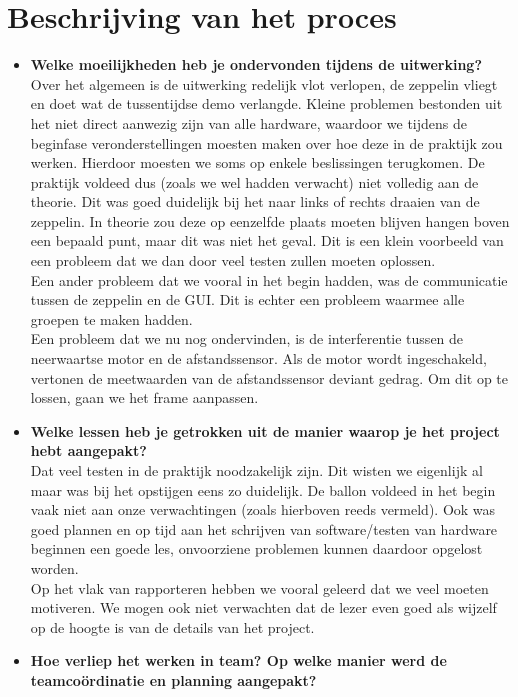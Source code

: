 \documentclass[eind]{penoverslag}
\begin{document}
\section{Beschrijving van het proces}
\begin{itemize}
\item \textbf{Welke moeilijkheden heb je ondervonden tijdens de uitwerking?} \\
Over het algemeen is de uitwerking redelijk vlot verlopen, de zeppelin vliegt en doet wat de tussentijdse demo verlangde.  Kleine problemen bestonden uit het niet direct aanwezig zijn van alle hardware, waardoor we tijdens de beginfase veronderstellingen moesten maken over hoe deze in de praktijk zou werken. Hierdoor moesten we soms op enkele beslissingen terugkomen. De praktijk voldeed dus (zoals we wel hadden verwacht) niet volledig aan de theorie. Dit was goed duidelijk bij het naar links of rechts draaien van de zeppelin. In theorie zou deze op eenzelfde plaats moeten blijven hangen boven een bepaald punt, maar dit was niet het geval. Dit is een klein voorbeeld van een probleem dat we dan door veel testen zullen moeten oplossen. \\
Een ander probleem dat we vooral in het begin hadden, was de communicatie tussen de zeppelin en de GUI. Dit is echter een probleem waarmee alle groepen te maken hadden.\\
Een probleem dat we nu nog ondervinden, is de interferentie tussen de neerwaartse motor en de afstandssensor. Als de motor wordt ingeschakeld, vertonen de meetwaarden van de afstandssensor deviant gedrag. Om dit op te lossen, gaan we het frame aanpassen. 
\item \textbf{Welke lessen heb je getrokken uit de manier waarop je het project hebt aangepakt?} \\
Dat veel testen in de praktijk noodzakelijk zijn. Dit wisten we eigenlijk al maar was bij het opstijgen eens zo duidelijk. De ballon voldeed in het begin vaak niet aan onze verwachtingen (zoals hierboven reeds vermeld). Ook was goed plannen en op tijd aan het schrijven van software/testen van hardware beginnen een goede les, onvoorziene problemen kunnen daardoor opgelost worden. \\
Op het vlak van rapporteren hebben we vooral geleerd dat we veel moeten motiveren. We mogen ook niet verwachten dat de lezer even goed als wijzelf op de hoogte is van de details van het project.
\item \textbf{Hoe verliep het werken in team? Op welke manier werd de teamco\"ordinatie en planning aangepakt?} \\

\end{itemize}
\end{document}
